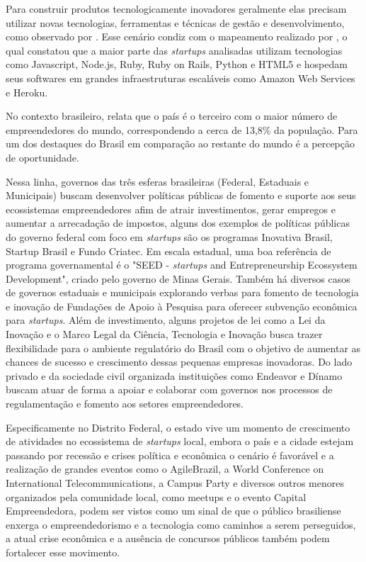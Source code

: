 Para construir produtos tecnologicamente inovadores geralmente elas precisam utilizar novas tecnologias, ferramentas e técnicas de gestão e desenvolvimento, como observado por . Esse cenário condiz com o mapeamento realizado por , o qual constatou que a maior parte das \textit{startups} analisadas utilizam tecnologias como Javascript, Node.js, Ruby, Ruby on Rails, Python e HTML5 e hospedam seus softwares em grandes infraestruturas escaláveis como Amazon Web Services e Heroku. 

No contexto brasileiro,  relata que o país é o terceiro com o maior número de empreendedores do mundo, correspondendo a cerca de 13,8\% da população. Para  um dos destaques do Brasil em comparação ao restante do mundo é a percepção de oportunidade.

Nessa linha, governos das três esferas brasileiras (Federal, Estaduais e Municipais) buscam desenvolver políticas públicas de fomento e suporte aos seus ecossistemas empreendedores afim de atrair investimentos, gerar empregos e aumentar a arrecadação de impostos, alguns dos exemplos de políticas públicas do governo federal com foco em \textit{startups} são os programas Inovativa Brasil, Startup Brasil e Fundo Criatec. Em escala estadual, uma boa referência de programa governamental é o "SEED - \textit{startups} and Entrepreneurship Ecossystem Development", criado pelo governo de Minas Gerais. Também há diversos casos de governos estaduais e municipais explorando verbas para fomento de tecnologia e inovação de Fundações de Apoio à Pesquisa para oferecer subvenção econômica para \textit{startups}. Além de investimento, alguns projetos de lei como a Lei da Inovação e o Marco Legal da Ciência, Tecnologia e Inovação busca trazer flexibilidade para o ambiente regulatório do Brasil com o objetivo de aumentar as chances de sucesso e crescimento dessas pequenas empresas inovadoras. Do lado privado e da sociedade civil organizada instituições como Endeavor e Dínamo buscam atuar de forma a apoiar e colaborar com governos nos processos de regulamentação e fomento aos setores empreendedores.

Especificamente no Distrito Federal, o estado vive um momento de crescimento de atividades no ecossistema de \textit{startups} local, embora o país e a cidade estejam passando por recessão e crises política e econômica o cenário é favorável e a realização de grandes eventos como o AgileBrazil, a World Conference on International Telecommunications, a Campus Party e diversos outros menores organizados pela comunidade local, como meetups e o evento Capital Empreendedora, podem ser vistos como um sinal de que o público brasiliense enxerga o empreendedorismo e a tecnologia como caminhos a serem perseguidos, a atual crise econômica e a ausência de concursos públicos também podem fortalecer esse movimento.

